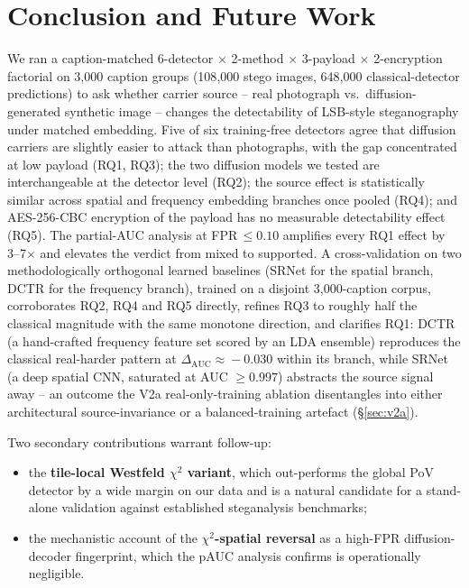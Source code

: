 \documentclass[10pt,twocolumn,a4paper]{article}
\begin{document}
\section{Conclusion and Future Work}
\label{sec:conclusion}

We ran a caption-matched 6-detector $\times$ 2-method $\times$ 3-payload $\times$ 2-encryption factorial on 3{,}000 caption groups (108{,}000 stego images, 648{,}000 classical-detector predictions) to ask whether carrier source -- real photograph vs.\ diffusion-generated synthetic image -- changes the detectability of LSB-style steganography under matched embedding. Five of six training-free detectors agree that diffusion carriers are slightly easier to attack than photographs, with the gap concentrated at low payload (RQ1, RQ3); the two diffusion models we tested are interchangeable at the detector level (RQ2); the source effect is statistically similar across spatial and frequency embedding branches once pooled (RQ4); and AES-256-CBC encryption of the payload has no measurable detectability effect (RQ5). The partial-AUC analysis at FPR\,$\leq\!0.10$ amplifies every RQ1 effect by 3--7$\times$ and elevates the verdict from mixed to supported. A cross-validation on two methodologically orthogonal learned baselines (SRNet for the spatial branch, DCTR for the frequency branch), trained on a disjoint 3{,}000-caption corpus, corroborates RQ2, RQ4 and RQ5 directly, refines RQ3 to roughly half the classical magnitude with the same monotone direction, and clarifies RQ1: DCTR (a hand-crafted frequency feature set scored by an LDA ensemble) reproduces the classical real-harder pattern at $\Delta_\text{AUC}\!\approx\!-0.030$ within its branch, while SRNet (a deep spatial CNN, saturated at AUC $\geq 0.997$) abstracts the source signal away -- an outcome the V2a real-only-training ablation disentangles into either architectural source-invariance or a balanced-training artefact (\S\ref{sec:v2a}).

Two secondary contributions warrant follow-up:
\begin{itemize}
\item the \textbf{tile-local Westfeld $\chi^2$ variant}, which out-performs the global PoV detector by a wide margin on our data and is a natural candidate for a stand-alone validation against established steganalysis benchmarks;
\item the mechanistic account of the \textbf{$\chi^2$-spatial reversal} as a high-FPR diffusion-decoder fingerprint, which the pAUC analysis confirms is operationally negligible.
\end{itemize}
\end{document}
